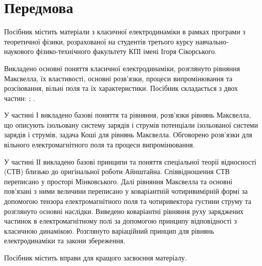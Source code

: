 
\chapter*{Передмова}\label{\currfilebase}


Посібник містить матеріали з класичної електродинаміки в рамках програми  з теоретичної фізики, розрахованої на студентів третього курсу навчально-наукового фізико-технічного факультету КПІ імені Ігоря Сікорського.


Викладено основні поняття класичної електродинаміки, розглянуто рівняння Максвелла, їх властивості, основні розв'язки, процеси випромінювання та розсіювання, вільні поля та їх характеристики. Посібник складається з двох частин: ;  .

У частині І викладено базові поняття та рівняння, розв'язки рівнянь Максвелла, що описують ізольовану систему зарядів і струмів потенціали ізольованої системи зарядів і струмів, задача Коші для рівнянь Максвелла. Обговорено розв'язки для вільного електромагнітного поля та процеси випромінювання.

У частині ІІ викладено базові принципи та поняття спеціальної теорії відносності (СТВ) близько до оригінальної роботи Айнштайна. Співвідношення СТВ переписано у просторі Мінковського.  Далі рівняння Максвелла та основні пов'язані з ними величини переписано у коваріантній чотиривимірній формі за допомогою тензора електромагнітного поля та чотиривектора густини струму та розглянуто основні наслідки. Виведено коваріантні рівняння руху заряджених частинок в електромагнітному полі за допомогою принципу відповідності з класичною динамікою. Розглянуто варіаційний принцип для рівнянь електродинаміки та закони збереження.

Посібник містить вправи для кращого засвоєння матеріалу.

